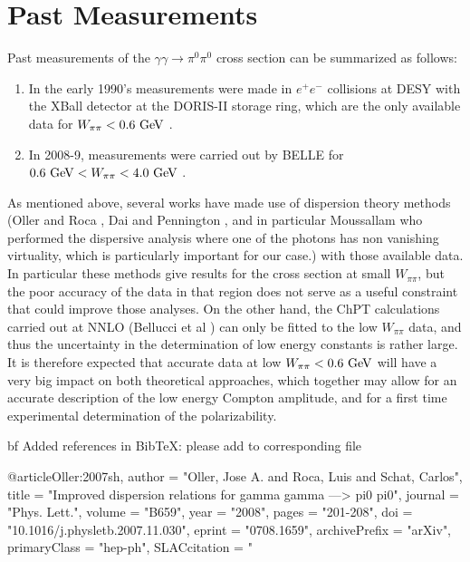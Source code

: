 \section{Past Measurements}
Past measurements of the $\gamma\gamma\to \pi^0\pi^0$ cross section can be summarized as follows:
\begin{enumerate}
    \item 
In the early 1990's measurements were made in $e^+e^-$ collisions at DESY   with the XBall detector at the DORIS-II storage ring, which are the only available data for $W_{\pi\pi}<0.6{\rm~ GeV}$ \cite{Marsiske:1990hx}. 
\item In 2008-9, measurements were carried out by BELLE
for $0.6{\rm~ GeV}<W_{\pi\pi}<4.0 {\rm~ GeV}$ \cite{Mori:2007bu,Uehara:2008ep,Uehara:2009cka}. 
\end{enumerate}
As mentioned above, several works have made use of dispersion theory methods (Oller and
Roca \cite{Oller:2008kf}, Dai and Pennington \cite{Dai:2016ytz}, and
in particular Moussallam \cite{Moussallam:2013una} who performed the
dispersive analysis where one of the photons has non vanishing
virtuality, which is particularly important for our case.) with those
available data. In particular these methods give results for the cross
section at small $W_{\pi\pi}$, but the poor accuracy of the data in
that region does not serve as a useful constraint that could improve
those analyses. On the other hand, the ChPT calculations carried out
at NNLO (Bellucci et al \cite{Bellucci:1994hx,Bellucci:1994eb} ) can
only be fitted to the low $W_{\pi\pi}$ data, and thus the uncertainty
in the determination of low energy constants is rather large. It is therefore
expected that accurate data at low $W_{\pi\pi}<0.6{\rm~ GeV}$ will
have a very big impact on both theoretical approaches, which together
may allow for an accurate description of the low energy Compton
amplitude, and for a first time experimental determination of the
polarizability.


{bf Added references in BibTeX: please add to corresponding file}

@article{Oller:2007sh,
	author         = "Oller, Jose A. and Roca, Luis and Schat, Carlos",
	title          = "{Improved dispersion relations for gamma gamma ---> pi0
		pi0}",
	journal        = "Phys. Lett.",
	volume         = "B659",
	year           = "2008",
	pages          = "201-208",
	doi            = "10.1016/j.physletb.2007.11.030",
	eprint         = "0708.1659",
	archivePrefix  = "arXiv",
	primaryClass   = "hep-ph",
	SLACcitation   = "%
}

